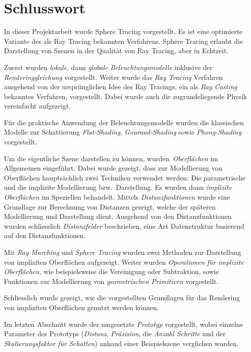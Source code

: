 
\chapter{Schlusswort}
\label{chap:discussion_and_conclusion}

In dieser Projektarbeit wurde Sphere Tracing vorgestellt. Es ist eine
optimierte Variante des als Ray Tracing bekannten Verfahrens.  Sphere
Tracing erlaubt die Darstellung von Szenen in der Qualität von Ray
Tracing, aber in Echtzeit.

Zuerst wurden \textit{lokale}, dann \textit{globale Beleuchtungsmodelle} inklusive der
\textit{Renderinggleichung} vorgestellt. Weiter wurde das \textit{Ray Tracing}
Verfahren ausgehend von der ursprünglichen Idee des Ray Tracings, ein
als \textit{Ray Casting} bekanntes Verfahren, vorgestellt. Dabei wurde auch die
zugrundeliegende Physik vereinfacht aufgezeigt.

Für die praktische Anwendung der Beleuchtungsmodelle wurden die
klassischen Modelle zur Schattierung \textit{Flat-Shading},
\textit{Gouraud-Shading} sowie \textit{Phong-Shading} vorgestellt.

Um die eigentliche Szene darstellen zu können,
wurden~\textit{Oberflächen} im Allgemeinen eingeführt. Dabei wurde
gezeigt, dass zur Modellierung von Oberflächen hauptsächlich zwei
Techniken verwendet werden: Die parametrische und die implizite
Modellierung bzw.\ Darstellung. Es wurden dann \textit{implizite
    Oberflächen} im Speziellen behandelt. Mittels
\textit{Distanzfunktionen} wurde eine Grundlage zur Berechnung von
Distanzen gezeigt, welche der späteren Modellierung und Darstellung
dient. Ausgehend von den Distanzfunktionen wurden schliesslich
\textit{Distanzfelder} beschrieben, eine Art Datenstruktur basierend auf
den Distanzfunktionen.

Mit \textit{Ray Marching} und \textit{Sphere Tracing} wurden zwei
Methoden zur Darstellung von impliziten Oberflächen aufgezeigt. Weiter
wurden \textit{Operationen für implizite Oberflächen}, wie
beispielsweise die Vereinigung oder Subtraktion, sowie Funktionen zur
Modellierung von \textit{geometrischen Primitiven} vorgestellt.

Schliesslich wurde gezeigt, wie die vorgestellten Grundlagen für das
Rendering von impliziten Oberflächen genutzt werden können.

Im letzten Abschnitt wurde der umgesetzte \textit{Prototyp} vorgestellt,
wobei einzelne Parameter des Prototyps (\textit{Distanz},
\textit{Präzision}, die \textit{Anzahl Schritte} und der
\textit{Skalierungsfaktor für Schatten}) anhand einer Beispielszene
verglichen wurden.


